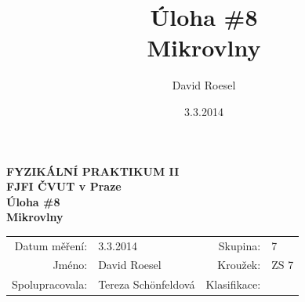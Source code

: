 \documentclass[english]{article}
\newcommand{\Author}{David Roesel}
\newcommand{\Coauthor}{Tereza Schönfeldová}
\newcommand{\Institute}{FJFI ČVUT v Praze}
\newcommand{\Subject}{FYZIKÁLNÍ PRAKTIKUM II}
\newcommand{\Group}{7}
\newcommand{\Circle}{ZS 7}
\newcommand{\Title}{Úloha \#8  \\Mikrovlny}
\newcommand{\Date}{3.3.2014}
\begin{document}
\author{\Author}
\title{\Title}
\date{\Date}

\renewcommand{\figurename}{Obr.}
\renewcommand{\tablename}{Tab.}
\renewcommand{\refname}{Reference}


\setlength{\parindent}{0cm}
\begin{multicols}{2}
\textbf{\Subject \\
        \Institute \\[0.1cm]
\Title \\[0.5cm]
}
\begin{tabular}{rlrl}
\large Datum měření: & \Date & \large Skupina: & \Group \\
\large Jméno: & \Author & \large Kroužek:  & \Circle\\
\large Spolupracovala: & \Coauthor &\large Klasifikace:\\
\end{tabular}


\end{multicols}
\end{document}
